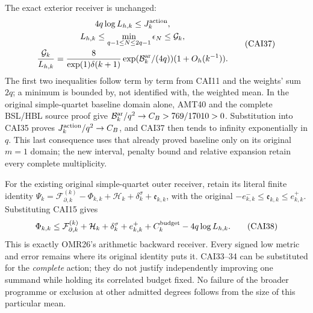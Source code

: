 The exact exterior receiver is unchanged:
\[
 \begin{gathered}
 4q\log L_{h,k}\le J_k^{\rm action},\\
 L_{h,k}\le\min_{q-1\le N\le2q-1}\epsilon_N\le\mathcal G_k,
 \\
 \frac{\mathcal G_k}{L_{h,k}}=
 \frac8{\exp(1)\delta(k+1)}\exp(\mathcal B_k^{\rm ar}/(4q))
                              (1+O_h(k^{-1})).\end{gathered}\tag{CAI37}
\]
The first two inequalities follow term by term from CAI11 and the
weights' sum $2q$; a minimum is bounded by, not identified with, the
weighted mean. In the original simple-quartet baseline domain alone,
AMT40 and the complete BSL/HBL source proof give
$\mathcal B_k^{\rm ar}/q^2\to C_B>769/17010>0$. Substitution into
CAI35 proves $J_k^{\rm action}/q^2\to C_B$, and CAI37 then tends to
infinity exponentially in $q$. This last consequence uses that already
proved baseline only on its original $m=1$ domain; the new interval,
penalty bound and relative expansion retain every complete multiplicity.

For the existing original simple-quartet outer receiver, retain its
literal finite identity
$\Psi_k=\mathcal F_{\partial,k}^{(k)}-\Phi_{k,k}
+\mathcal H_k+\delta_k^\sigma+\mathfrak e_{k,k}$, with the original
$-e_{k,k}^-\le\mathfrak e_{k,k}\le e_{k,k}^+$. Substituting CAI15 gives
\[
 \Phi_{k,k}\le\mathcal F_{\partial,k}^{(k)}+\mathcal H_k
       +\delta_k^\sigma+e_{k,k}^++C_k^{\rm budget}-4q\log L_{h,k}.
 \tag{CAI38}
\]
This is exactly OMR26's arithmetic backward receiver. Every signed low
metric and error remains where its original identity puts it. CAI33--34
can be substituted for the \emph{complete} action; they do not justify
independently improving one summand while holding its correlated budget
fixed. No failure of the broader programme or exclusion at other
admitted degrees follows from the size of this particular mean.
